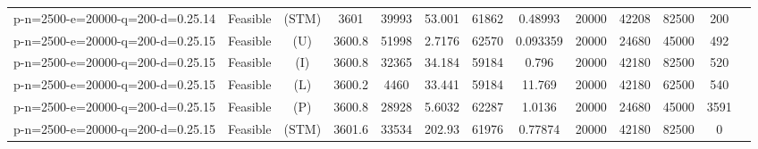 \documentclass[landscape, a4paper]{article}
\newcommand{\STM}{\ensuremath{\mathrm{STM}}}
\newcommand{\Improved}{\ensuremath{\mathrm{I}}}
\newcommand{\Loose}{\ensuremath{\mathrm{L}}}
\newcommand{\Profit}{\ensuremath{\mathrm{P}}}
\newcommand{\Utility}{\ensuremath{\mathrm{U}}}
\begin{document}
\begin{center}
\begin{tabular}{lcccccccccccc}
p-n=2500-e=20000-q=200-d=0.25.14 & Feasible & (\STM) & 3601 & 39993 & 53.001 & 61862 & 0.48993 & 20000 & 42208 & 82500 & 200 & \\
p-n=2500-e=20000-q=200-d=0.25.15 & Feasible & (\Utility) & 3600.8 & 51998 & 2.7176 & 62570 & 0.093359 & 20000 & 24680 & 45000 & 492 & \\
p-n=2500-e=20000-q=200-d=0.25.15 & Feasible & (\Improved) & 3600.8 & 32365 & 34.184 & 59184 & 0.796 & 20000 & 42180 & 82500 & 520 & \\
p-n=2500-e=20000-q=200-d=0.25.15 & Feasible & (\Loose) & 3600.2 & 4460 & 33.441 & 59184 & 11.769 & 20000 & 42180 & 62500 & 540 & \\
p-n=2500-e=20000-q=200-d=0.25.15 & Feasible & (\Profit) & 3600.8 & 28928 & 5.6032 & 62287 & 1.0136 & 20000 & 24680 & 45000 & 3591 & \\
p-n=2500-e=20000-q=200-d=0.25.15 & Feasible & (\STM) & 3601.6 & 33534 & 202.93 & 61976 & 0.77874 & 20000 & 42180 & 82500 & 0 & \\
\end{tabular}
\end{center}
\end{document}

